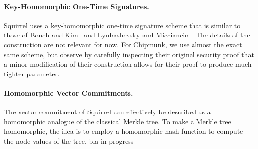\paragraph{Key-Homomorphic One-Time Signatures.}
Squirrel uses a key-homomorphic one-time signature scheme that is similar to those of Boneh and Kim~\cite{BonKim2020} and Lyubashevsky and Micciancio~\cite{TCC:LyuMic08}.
The details of the construction are not relevant for now.
For Chipmunk, we use almost the exact same scheme, but observe by carefully inspecting their original security proof that a minor modification of their construction allows for their proof to produce much tighter parameter.

\paragraph{Homomorphic Vector Commitments.}
The vector commitment of Squirrel can effectively be described as a homomorphic analogue of the classical Merkle tree.
To make a Merkle tree homomorphic, the idea is to employ a homomorphic hash function to compute the node values of the tree.
{\color{red} bla in progress}












